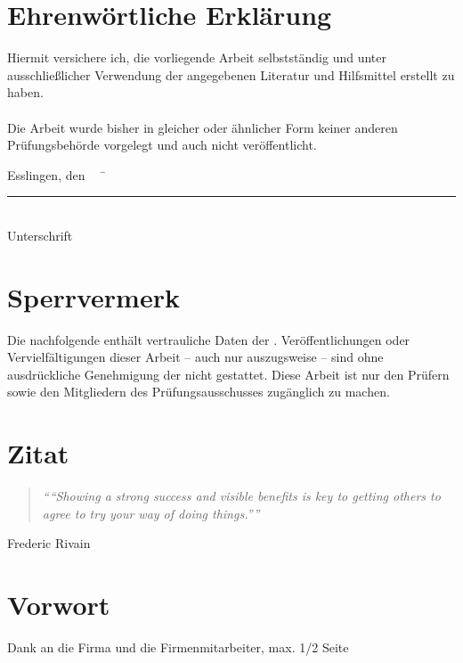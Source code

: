 \chapter*{Ehrenwörtliche Erklärung}

Hiermit versichere ich, die vorliegende Arbeit selbstständig und unter ausschließlicher Verwendung der angegebenen Literatur und Hilfsmittel erstellt zu haben.\\\\
Die Arbeit wurde bisher in gleicher oder ähnlicher Form keiner anderen Prüfungsbehörde vorgelegt und auch nicht veröffentlicht.\\
\begin{tabbing}
          Esslingen, den \workDatum ~~	\= \rule{5cm}{0.3mm}\\
                                                                                                    \> Unterschrift
\end{tabbing}
%
\newpage
%
\chapter*{Sperrvermerk} %

Die nachfolgende \workTyp enthält vertrauliche Daten der \workFirma.
Veröffentlichungen oder Vervielfältigungen dieser Arbeit -- auch nur auszugsweise -- sind ohne ausdrückliche Genehmigung der \workFirma nicht gestattet.
Diese Arbeit ist nur den Prüfern sowie den Mitgliedern des Prüfungsausschusses zugänglich zu machen.
\newpage
%
\chapter*{Zitat} %
\begin{center}
\begin{minipage}{12cm}
\begin{quotation}
\textit{\enquote{“Showing a strong success and visible benefits is key to getting others to agree to try your way of doing things.”}}
\end{quotation}
\hfill \textsf Frederic Rivain
\end{minipage}
\end{center}
\newpage{}
\chapter*{Vorwort} %

Dank an die Firma und die Firmenmitarbeiter, max. 1/2 Seite

\newpage
